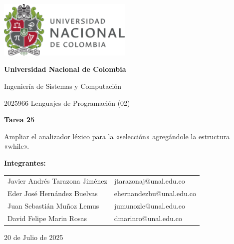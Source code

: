 \documentclass{article}
\begin{document}
\begin{titlepage}
    \centering
    \includegraphics[width=0.48\textwidth]{logo_universidad.png}
    \par\vspace{2cm}

    {\Large \textbf{Universidad Nacional de Colombia} \par}
    \vspace{0.5cm}
    {\large Ingeniería de Sistemas y Computación \par}
    {\large 2025966 Lenguajes de Programación (02)\par}
    \vspace{3cm}

    {\large \textbf{Tarea 25} \par}
    {\large Ampliar el analizador léxico para la «selección» agregándole la estructura «while».\par}
    \vspace{3cm}

    {\large \textbf{Integrantes:} \par}
    \vspace{0.5cm}
    \begin{tabular}{ll}
    Javier Andrés Tarazona Jiménez & jtarazonaj@unal.edu.co \\
    Eder  José Hernández Buelvas   & ehernandezbu@unal.edu.co \\
    Juan Sebastián Muñoz Lemus     & jumunozle@unal.edu.co   \\
    David Felipe Marin Rosas       & dmarinro@unal.edu.co   \\
    \end{tabular}
    \par\vspace{3cm}

    {\large 20 de Julio de 2025 \par}
\end{titlepage}

\tableofcontents %
\end{document}
